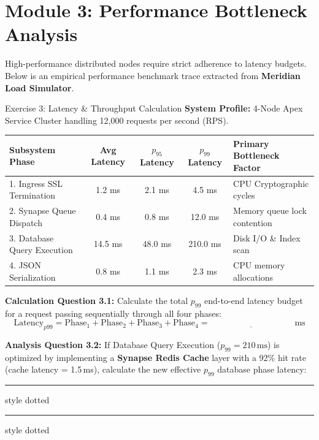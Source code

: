 \documentclass[11pt, a4paper, parskip=half]{scrartcl}
\begin{document}
\newpage


\section{Module 3: Performance Bottleneck Analysis}

High-performance distributed nodes require strict adherence to latency budgets. Below is an empirical performance benchmark trace extracted from \textbf{Meridian Load Simulator}.

\begin{exercisebox}[label=ex:perf]{Exercise 3: Latency \& Throughput Calculation}
\textbf{System Profile:} 4-Node Apex Service Cluster handling 12,000 requests per second (RPS).

\vspace{1pt}
\begin{center}
\small
\begin{tabularx}{\textwidth}{l c c c X}
\toprule
\textbf{Subsystem Phase} & \textbf{Avg Latency} & \textbf{$p_{95}$ Latency} & \textbf{$p_{99}$ Latency} & \textbf{Primary Bottleneck Factor} \\
\midrule
1. Ingress SSL Termination & 1.2 ms & 2.1 ms & 4.5 ms & CPU Cryptographic cycles \\
2. Synapse Queue Dispatch & 0.4 ms & 0.8 ms & 12.0 ms & Memory queue lock contention \\
3. Database Query Execution & 14.5 ms & 48.0 ms & 210.0 ms & Disk I/O \& Index scan \\
4. JSON Serialization & 0.8 ms & 1.1 ms & 2.3 ms & CPU memory allocations \\
\bottomrule
\end{tabularx}
\end{center}

\vspace{1pt}
\textbf{Calculation Question 3.1:} Calculate the total $p_{99}$ end-to-end latency budget for a request passing sequentially through all four phases:
\begin{equation*}
    \text{Latency}_{p99} = \text{Phase}_1 + \text{Phase}_2 + \text{Phase}_3 + \text{Phase}_4 = \underline{\hspace{4cm}} \text{ ms}
\end{equation*}

\vspace{1pt}
\textbf{Analysis Question 3.2:} If Database Query Execution ($p_{99} = 210\,\text{ms}$) is optimized by implementing a \textbf{Synapse Redis Cache} layer with a 92\% hit rate (cache latency = 1.5\,ms), calculate the new effective $p_{99}$ database phase latency:
\vspace{12pt}
\hrule style dotted
\vspace{12pt}
\hrule style dotted
\end{exercisebox}
\end{document}
